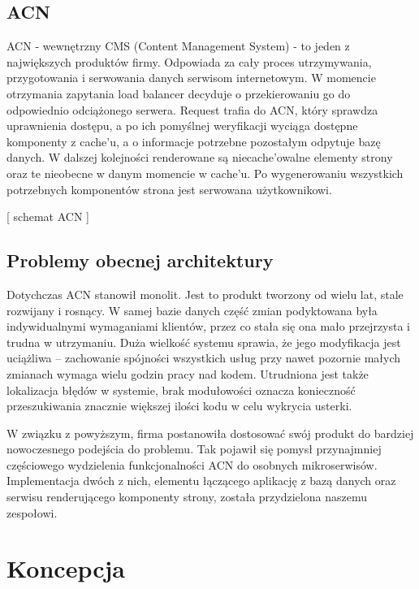 \documentclass[licencjacka]{pracamgr}
\begin{document}
\section{ACN}

ACN - wewnętrzny CMS (Content Management System) - to jeden z największych produktów firmy. Odpowiada za cały proces utrzymywania, przygotowania i serwowania danych serwisom internetowym. W momencie otrzymania zapytania load balancer decyduje o przekierowaniu go do odpowiednio odciążonego serwera. Request trafia do ACN, który sprawdza uprawnienia dostępu, a po ich pomyślnej weryfikacji wyciąga dostępne komponenty z cache’u, a o informacje potrzebne pozostałym odpytuje bazę danych. W dalszej kolejności renderowane są niecache’owalne elementy strony oraz te nieobecne w danym momencie w cache’u. Po wygenerowaniu wszystkich potrzebnych komponentów strona jest serwowana użytkownikowi.

\vspace{1mm}

[ schemat ACN ]

\section{Problemy obecnej architektury}
Dotychczas ACN stanowił monolit. Jest to produkt tworzony od wielu lat, stale rozwijany i rosnący. W samej bazie danych część zmian podyktowana była indywidualnymi wymaganiami klientów, przez co stała się ona mało przejrzysta i trudna w utrzymaniu. Duża wielkość systemu sprawia, że jego modyfikacja jest uciążliwa – zachowanie spójności wszystkich usług przy nawet pozornie małych zmianach wymaga wielu godzin pracy nad kodem. Utrudniona jest także lokalizacja błędów w systemie, brak modułowości oznacza konieczność przeszukiwania znacznie większej ilości kodu w celu wykrycia usterki.

\vspace{1mm}

W związku z powyższym, firma postanowiła dostosować swój produkt do bardziej nowoczesnego podejścia do problemu. Tak pojawił się pomysł przynajmniej częściowego wydzielenia funkcjonalności ACN do osobnych mikroserwisów. Implementacja dwóch z nich, elementu łączącego aplikację z bazą danych oraz serwisu renderującego komponenty strony, została przydzielona naszemu zespołowi.

\chapter{Koncepcja}
	
\end{document}
